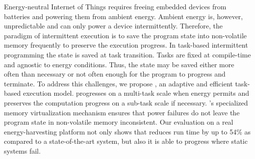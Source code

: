 
Energy-neutral Internet of Things requires freeing embedded devices from batteries and powering them from ambient energy. Ambient energy is, however, unpredictable and can only power a device intermittently. Therefore, the paradigm of intermittent execution is to save the program state into non-volatile memory frequently to preserve the execution progress. In task-based intermittent programming the state is saved at task transition. Tasks are fixed at compile-time and agnostic to energy conditions. Thus, the state may be saved either more often than necessary or not often enough for the program to progress and terminate. To address this challenges, we propose \sys, an adaptive and efficient task-based execution model. \sys progresses on a multi-task scale when energy permits and preserves the computation progress on a sub-task scale if necessary. \sys's specialized memory virtualization mechanism ensures that power failures do not leave the program state in non-volatile memory inconsistent. Our evaluation on a real energy-harvesting platform not only shows that \sys reduces run time by up to 54\% as compared to a state-of-the-art system, but also it is able to progress where static systems fail.